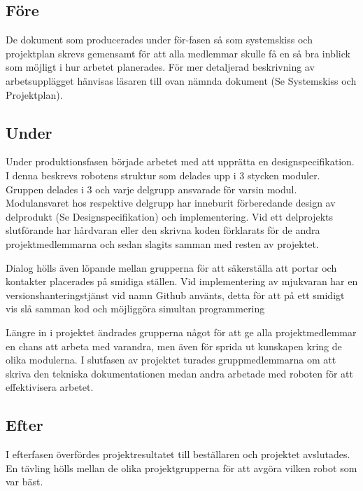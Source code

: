 \documentclass[a4paper,12pt,fleqn]{article}
\begin{document}
\subsection{Före}
De dokument som producerades under för-fasen så som systemskiss och projektplan skrevs gemensamt för att alla medlemmar skulle få en så bra inblick som möjligt i hur arbetet planerades. För mer detaljerad beskrivning av arbetsupplägget hänvisas läsaren till ovan nämnda dokument (Se Systemskiss och Projektplan).

\subsection{Under}
Under produktionsfasen började arbetet med att upprätta en designspecifikation. I denna beskrevs robotens struktur som delades upp i 3 stycken moduler. Gruppen delades i 3 och varje delgrupp ansvarade för varsin modul. Modulansvaret hos respektive delgrupp har inneburit förberedande design av delprodukt (Se Designspecifikation) och implementering. 
Vid ett delprojekts slutförande har hårdvaran eller den skrivna koden förklarats för de andra projektmedlemmarna och sedan slagits samman med resten av projektet. 

Dialog hölls även löpande mellan grupperna för att säkerställa att portar och kontakter placerades på smidiga ställen. Vid implementering av mjukvaran har en versionshanteringstjänst vid namn Github använts, detta för att på ett smidigt vis slå samman kod och möjliggöra simultan programmering

Längre in i projektet ändrades grupperna något för att ge alla projektmedlemmar en chans att arbeta med varandra, men även för sprida ut kunskapen kring de olika modulerna.
I slutfasen av projektet turades gruppmedlemmarna om att skriva den tekniska dokumentationen medan andra arbetade med roboten för att effektivisera arbetet.

\subsection{Efter}
I efterfasen överfördes projektresultatet till beställaren och projektet avslutades. En tävling hölls mellan de olika projektgrupperna för att avgöra vilken robot som var bäst. 
\end{document}
